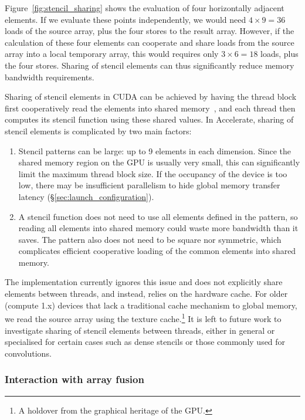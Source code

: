 Figure~\ref{fig:stencil_sharing} shows the evaluation of four horizontally
adjacent elements. If we evaluate these points independently, we would need
$4 \times 9 = 36$ loads of the source array, plus the four stores to the result
array. However, if the calculation of these four elements can cooperate and
share loads from the source array into a local temporary array, this would
requires only $3 \times 6 = 18$ loads, plus the four stores. Sharing of stencil
elements can thus significantly reduce memory bandwidth requirements.

Sharing of stencil elements in CUDA\cuda{} can be achieved by having the thread
block first cooperatively read the 
elements into  shared memory~\cite{NVIDIA:2012wf}, and
each thread then computes its stencil function using these shared values. In
Accelerate, sharing of stencil elements is complicated by two main factors:
%
\begin{enumerate}
    \item Stencil patterns can be large: up to 9 elements in each dimension.
        Since the shared memory region on the GPU is usually very small, this
        can significantly limit the maximum thread block size. If the occupancy
        of the device is too low, there may be insufficient parallelism to hide
        global memory transfer latency (\S\ref{sec:launch_configuration}).

    \item A stencil function does not need to use all elements defined in the
        pattern, so reading all elements into shared memory could waste more
        bandwidth than it saves. The pattern also does not need to be square nor
        symmetric, which complicates efficient cooperative loading of the
        common elements into shared memory.
\end{enumerate}

The implementation currently ignores this issue and does not explicitly share
elements between threads, and instead, relies on the hardware cache. For older
(compute 1.x) devices that lack a traditional cache mechanism to global memory,
we read the source array using the texture cache.\footnote{A holdover from the
graphical heritage of the GPU\gpu{}.} It is left to future work to investigate sharing
of stencil elements between threads, either in general or specialised for
certain cases such as dense stencils or those commonly used for
convolutions.


\subsubsection{Interaction with array fusion}

